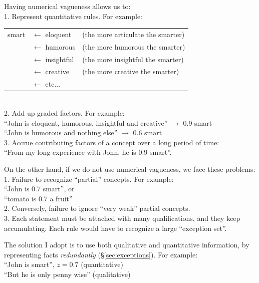 Having numerical vagueness allows us to:\\
1. Represent quantitative rules.  For example:\\
\hspace*{1cm} \begin{tabular}{l l l}
smart & $\leftarrow$ eloquent    & (the more articulate the smarter)\\
      & $\leftarrow$ humorous    & (the more humorous the smarter)\\
      & $\leftarrow$ insightful  & (the more insightful the smarter)\\
      & $\leftarrow$ creative    & (the more creative the smarter)\\
      & $\leftarrow$ etc...      &
\end{tabular}\\
2. Add up graded factors.  For example:\\
\hspace*{1cm} ``John is eloquent, humorous, insightful and creative'' $\rightarrow$ 0.9 smart\\
\hspace*{1cm} ``John is humorous and nothing else'' $\rightarrow$ 0.6 smart\\
3. Accrue contributing factors of a concept over a long period of time:\\
\hspace*{1cm} ``From my long experience with John, he is 0.9 smart''.

On the other hand, if we do not use numerical vagueness, we face these problems:\\
1. Failure to recognize ``partial'' concepts.  For example:\\
\hspace*{1cm} ``John is 0.7 smart'', or\\
\hspace*{1cm} ``tomato is 0.7 a fruit''\\
2. Conversely, failure to ignore ``very weak'' partial concepts.\\
3. Each statement must be attached with many qualifications, and they keep accumulating. Each rule would have to recognize a large ``exception set''.

The solution I adopt is to use both qualitative and quantitative information, by representing facts \textit{redundantly} (\S\ref{sec:exceptions}).  For example:\\
\hspace*{1cm} ``John is smart'', $z = 0.7$ (quantitative)\\
\hspace*{1cm} ``But he is only penny wise'' (qualitative)

